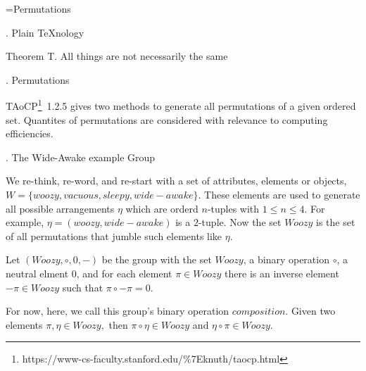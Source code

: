 
\def\a{\left(\matrix}
\def\b{\cr}
\def\c{\right)}

\def\d{\footnote*{http://web.mit.edu/sp.268/www/rubik.pdf}}
\def\f{\footnote*{https://www-cs-faculty.stanford.edu/\%7Eknuth/taocp.html}}
\def\e{\bigskip}
\def\R{{Woozy}}
\def\*{\circ}

\vsize=300pt %
\hsize=480pt %
\footline={\tenrm Permutations\quad\dotfill\quad \folio}
\raggedright

. Plain \TeX nology %

\proclaim Theorem T. All things are not necessarily the same

. Permutations

\e
TAoCP\f~1.2.5 gives two methods to generate all permutations
of a given ordered set. Quantites of permutations are considered
with relevance to computing efficiencies.

. The Wide-Awake example Group

\e
We re-think, re-word, and re-start
with a set of attributes, elements or objects,\break
$W=\{woozy, vacuous, sleepy, wide-awake\}.$
These elements are used to generate all possible
arrangements $\eta$ which are orderd $n$-tuples with
$1\le n\le4.$
For example, $\eta=(woozy, wide-awake)$ is a $2$-tuple.
Now the set $\R$ is the set of all permutations that jumble
such elements like $\eta.$

\e
Let $(\R,\*,0,-)$ be the group with the set $\R$, a binary
operation $\*$, a neutral elment $0$, and
for each element $\pi\in\R$ there is an inverse element
$-\pi\in\R$ such that $\pi\*-\pi=0.$

\e
For now, here, we call this group's binary operation $composition$.
Given two elements
$\pi,\eta\in\R,$ then
$\pi\*\eta\in\R$ and $\eta\*\pi\in\R.$


\bye
